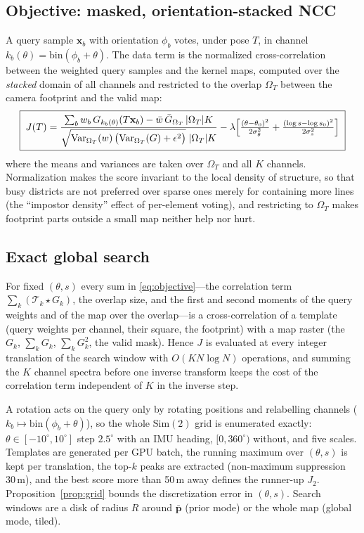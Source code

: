 \subsection{Objective: masked, orientation-stacked NCC}
\label{sec:objective}
A query sample $\mathbf x_b$ with orientation $\phi_b$ votes, under pose $T$, in
channel $k_b(\theta)=\mathrm{bin}(\phi_b+\theta)$. The data term is the
normalized cross-correlation between the weighted query samples and the kernel
maps, computed over the \emph{stacked} domain of all channels and restricted to
the overlap $\Omega_T$ between the camera footprint and the valid map:
\begin{equation}
\boxed{\;
 J(T)=\frac{\sum_b w_b\,G_{k_b(\theta)}(T\mathbf x_b)-\bar w\,\bar G_{\Omega_T}\,|\Omega_T|K}
 {\sqrt{\mathrm{Var}_{\Omega_T}(w)\,\bigl(\mathrm{Var}_{\Omega_T}(G)+\epsilon^2\bigr)}\;|\Omega_T|K}
 -\lambda\Bigl[\tfrac{(\theta-\theta_0)^2}{2\sigma_\theta^2}+\tfrac{(\log s-\log s_0)^2}{2\sigma_s^2}\Bigr]\;}
 \label{eq:objective}
\end{equation}
where the means and variances are taken over $\Omega_T$ and all $K$ channels.
Normalization makes the score invariant to the local density of structure, so
that busy districts are not preferred over sparse ones merely for containing
more lines (the ``impostor density'' effect of per-element voting), and
restricting to $\Omega_T$ makes footprint parts outside a small map neither
help nor hurt.

\subsection{Exact global search}
\label{sec:fft}
\begin{proposition}
\label{prop:fft}
For fixed $(\theta,s)$ every sum in \eqref{eq:objective}---the correlation
term $\sum_k(\mathcal T_k\star G_k)$, the overlap size, and the first and second
moments of the query weights and of the map over the overlap---is a
cross-correlation of a template (query weights per channel, their square, the
footprint) with a map raster (the $G_k$, $\sum_kG_k$, $\sum_kG_k^2$, the valid
mask). Hence $J$ is evaluated at every integer translation of the search window
with $O(K N\log N)$ operations, and summing the $K$ channel spectra before one
inverse transform keeps the cost of the correlation term independent of $K$ in
the inverse step.
\end{proposition}
A rotation acts on the query only by rotating positions and relabelling
channels ($k_b\mapsto\mathrm{bin}(\phi_b+\theta)$), so the whole $\mathrm{Sim}(2)$
grid is enumerated exactly: $\theta\in[-10^\circ,10^\circ]$ step $2.5^\circ$
with an IMU heading, $[0,360^\circ)$ without, and five scales. Templates are
generated per GPU batch, the running maximum over $(\theta,s)$ is kept per
translation, the top-$k$ peaks are extracted (non-maximum suppression 30\,m),
and the best score more than 50\,m away defines the runner-up $J_2$.
Proposition~\ref{prop:grid} bounds the discretization error in $(\theta,s)$.
Search windows are a disk of radius $R$ around $\bar{\mathbf p}$ (prior mode) or
the whole map (global mode, tiled).

